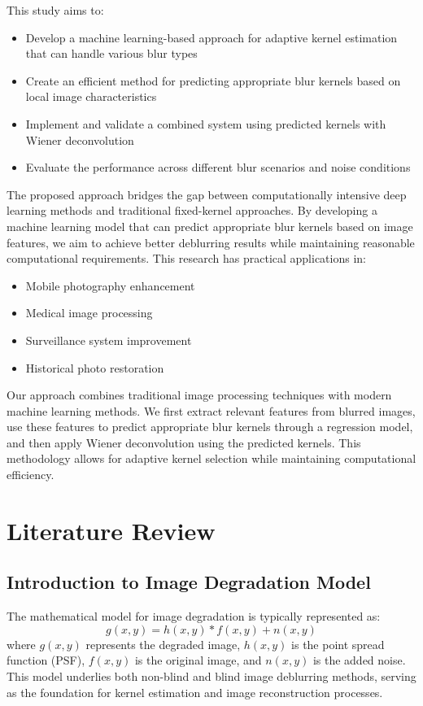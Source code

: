 \documentclass[twoside,11pt]{article}
\begin{document}
\singlespacing
This study aims to:
\begin{itemize}
\item Develop a machine learning-based approach for adaptive kernel estimation that can handle various blur types
\item Create an efficient method for predicting appropriate blur kernels based on local image characteristics
\item Implement and validate a combined system using predicted kernels with Wiener deconvolution
\item Evaluate the performance across different blur scenarios and noise conditions
\end{itemize}
\singlespacing
The proposed approach bridges the gap between computationally intensive deep learning methods and traditional fixed-kernel approaches. By developing a machine learning model that can predict appropriate blur kernels based on image features, we aim to achieve better deblurring results while maintaining reasonable computational requirements. This research has practical applications in:
\begin{itemize}
\item Mobile photography enhancement
\item Medical image processing
\item Surveillance system improvement
\item Historical photo restoration
\end{itemize}
\singlespacing
Our approach combines traditional image processing techniques with modern machine learning methods. We first extract relevant features from blurred images, use these features to predict appropriate blur kernels through a regression model, and then apply Wiener deconvolution using the predicted kernels. This methodology allows for adaptive kernel selection while maintaining computational efficiency.

\section{Literature Review}

\subsection{Introduction to Image Degradation Model}
The mathematical model for image degradation is typically represented as:
\[
g(x, y) = h(x, y) * f(x, y) + n(x, y)
\]
where \( g(x, y) \) represents the degraded image, \( h(x, y) \) is the point spread function (PSF), \( f(x, y) \) is the original image, and \( n(x, y) \) is the added noise. This model underlies both non-blind and blind image deblurring methods, serving as the foundation for kernel estimation and image reconstruction processes.
\end{document}
